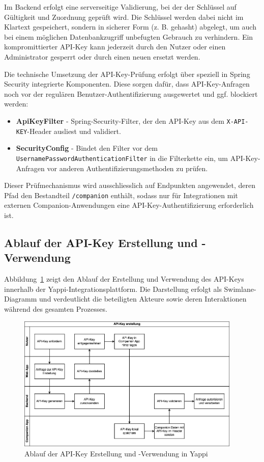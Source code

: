 \documentclass[12pt,a4paper]{report}
\begin{document}
Im Backend erfolgt eine serverseitige Validierung, bei der der Schlüssel auf Gültigkeit und Zuordnung geprüft wird. Die Schlüssel
werden dabei nicht im Klartext gespeichert, sondern in sicherer Form (z. B. gehasht) abgelegt, um auch bei einem möglichen
Datenbankzugriff unbefugten Gebrauch zu verhindern. Ein kompromittierter API-Key kann jederzeit durch den Nutzer oder einen
Administrator gesperrt oder durch einen neuen ersetzt werden.

Die technische Umsetzung der API-Key-Prüfung erfolgt über speziell in Spring Security integrierte Komponenten. Diese sorgen dafür,
dass API-Key-Anfragen noch vor der regulären Benutzer-Authentifizierung ausgewertet und ggf. blockiert werden:

\begin{itemize}
  \item \textbf{ApiKeyFilter} - Spring-Security-Filter, der den API-Key aus dem \texttt{X-API-KEY}-Header ausliest und validiert.
  \item \textbf{SecurityConfig} - Bindet den Filter vor dem \texttt{UsernamePasswordAuthenticationFilter} in die Filterkette ein,
    um API-Key-Anfragen vor anderen Authentifizierungsmethoden zu prüfen.
\end{itemize}

Dieser Prüfmechanismus wird ausschliesslich auf Endpunkten angewendet, deren Pfad den Bestandteil \texttt{/companion} enthält, 
sodass nur für Integrationen mit externen Companion-Anwendungen eine API-Key-Authentifizierung erforderlich ist.

\subsection{Ablauf der API-Key Erstellung und -Verwendung}

Abbildung~\ref{fig:apikey-swimlane} zeigt den Ablauf der Erstellung und Verwendung des API-Keys innerhalb der
Yappi-Integrationsplattform. Die Darstellung erfolgt als Swimlane-Diagramm und verdeutlicht die beteiligten Akteure sowie deren
Interaktionen während des gesamten Prozesses.

\begin{figure}[H]
  \centering
  \includegraphics[width=0.95\textwidth]{../figures/apikey-swimlane-diagram.drawio.png}
  \caption{Ablauf der API-Key Erstellung und -Verwendung in Yappi}
  \label{fig:apikey-swimlane}
\end{figure}
\end{document}

